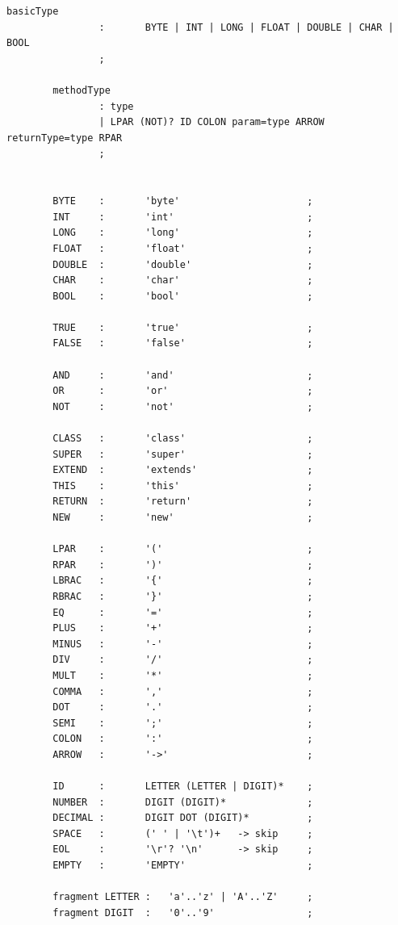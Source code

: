 \documentclass{l4proj}
\begin{document}
\begin{appendices}
\begin{lstlisting}[label={lst:sfjgrammar}, caption={The full ANTLR grammar for SFJ language}]
        basicType
                :       BYTE | INT | LONG | FLOAT | DOUBLE | CHAR | BOOL
                ;

        methodType
                : type
                | LPAR (NOT)? ID COLON param=type ARROW returnType=type RPAR
                ;


        BYTE    :       'byte'                      ;
        INT     :       'int'                       ;
        LONG    :       'long'                      ;
        FLOAT   :       'float'                     ;
        DOUBLE  :       'double'                    ;
        CHAR    :       'char'                      ;
        BOOL    :       'bool'                      ;

        TRUE    :       'true'                      ;
        FALSE   :       'false'                     ;

        AND     :       'and'                       ;
        OR      :       'or'                        ;
        NOT     :       'not'                       ;

        CLASS   :       'class'                     ;
        SUPER   :       'super'                     ;
        EXTEND  :       'extends'                   ;
        THIS    :       'this'                      ;
        RETURN  :       'return'                    ;
        NEW     :       'new'                       ;

        LPAR    :       '('                         ;
        RPAR    :       ')'                         ;
        LBRAC   :       '{'                         ;
        RBRAC   :       '}'                         ;
        EQ      :       '='                         ;
        PLUS    :       '+'                         ;
        MINUS   :       '-'                         ;
        DIV     :       '/'                         ;
        MULT    :       '*'                         ;
        COMMA   :       ','                         ;
        DOT     :       '.'                         ;
        SEMI    :       ';'                         ;
        COLON   :       ':'                         ;
        ARROW   :       '->'                        ;

        ID      :       LETTER (LETTER | DIGIT)*    ;
        NUMBER  :       DIGIT (DIGIT)*              ;
        DECIMAL :       DIGIT DOT (DIGIT)*          ;
        SPACE   :       (' ' | '\t')+   -> skip     ;
        EOL     :       '\r'? '\n'      -> skip     ;
        EMPTY   :       'EMPTY'                     ;

        fragment LETTER :   'a'..'z' | 'A'..'Z'     ;
        fragment DIGIT  :   '0'..'9'                ;
    \end{lstlisting}

\end{appendices}





\end{document}
